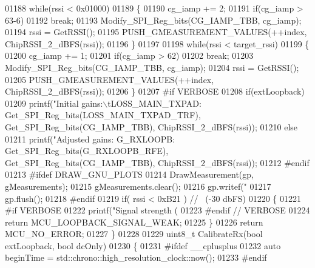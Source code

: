 \begin{DoxyCode}
{{{{{{{{{{{{{{{{{{{{{{{01188     \textcolor{keywordflow}{while}(rssi < 0x01000)
01189     \{
01190         cg\_iamp += 2;
01191         \textcolor{keywordflow}{if}(cg\_iamp > 63-6)
01192             \textcolor{keywordflow}{break};
01193         Modify_SPI_Reg_bits(CG_IAMP_TBB, cg\_iamp);
01194         rssi = GetRSSI();
01195         PUSH_GMEASUREMENT_VALUES(++index, ChipRSSI\_2\_dBFS(rssi));
01196     \}
01197 
01198     \textcolor{keywordflow}{while}(rssi < target\_rssi)
01199     \{
01200         cg\_iamp += 1;
01201         \textcolor{keywordflow}{if}(cg\_iamp > 62)
01202             \textcolor{keywordflow}{break};
01203         Modify_SPI_Reg_bits(CG_IAMP_TBB, cg\_iamp);
01204         rssi = GetRSSI();
01205         PUSH_GMEASUREMENT_VALUES(++index, ChipRSSI\_2\_dBFS(rssi));
01206     \}
01207 \textcolor{preprocessor}{#if VERBOSE}
01208     \textcolor{keywordflow}{if}(extLoopback)
01209         printf(\textcolor{stringliteral}{"Initial gains:\(\backslash\)tLOSS\_MAIN\_TXPAD: %
      Get_SPI_Reg_bits(LOSS_MAIN_TXPAD_TRF), Get_SPI_Reg_bits(CG_IAMP_TBB), ChipRSSI\_2\_dBFS(rssi));
01210     \textcolor{keywordflow}{else}
01211         printf(\textcolor{stringliteral}{"Adjusted gains: G\_RXLOOPB: %
      Get_SPI_Reg_bits(G_RXLOOPB_RFE), Get_SPI_Reg_bits(CG_IAMP_TBB), ChipRSSI\_2\_dBFS(rssi));
01212 \textcolor{preprocessor}{#endif}
01213 \textcolor{preprocessor}{#ifdef DRAW\_GNU\_PLOTS}
01214     DrawMeasurement(gp, gMeasurements);
01215     gMeasurements.clear();
01216     gp.writef(\textcolor{stringliteral}{"%
01217     gp.flush();
01218 \textcolor{preprocessor}{#endif}
01219     \textcolor{keywordflow}{if}( rssi < 0xB21 ) \textcolor{comment}{// ~(-30 dbFS)}
01220     \{
01221 \textcolor{preprocessor}{#if VERBOSE}
01222         printf(\textcolor{stringliteral}{"Signal strength (%
01223 \textcolor{preprocessor}{#endif // VERBOSE}
01224         \textcolor{keywordflow}{return} MCU_LOOPBACK_SIGNAL_WEAK;
01225     \}
01226     \textcolor{keywordflow}{return} MCU_NO_ERROR;
01227 \}
01228 
01229 uint8\_t CalibrateRx(\textcolor{keywordtype}{bool} extLoopback, \textcolor{keywordtype}{bool} dcOnly)
01230 \{
01231 \textcolor{preprocessor}{#ifdef \_\_cplusplus}
01232     \textcolor{keyword}{auto} beginTime = std::chrono::high\_resolution\_clock::now();
01233 \textcolor{preprocessor}{#endif}
}}}}}}}}}}}}}}}}}}}}}}}}}}}
\end{DoxyCode}
